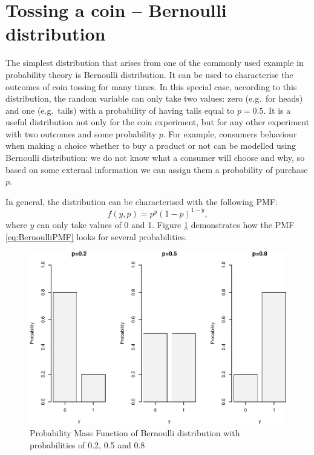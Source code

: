 \documentclass[
]{book}
\theoremstyle{definition}
\theoremstyle{definition}
\theoremstyle{definition}
\theoremstyle{definition}
\theoremstyle{remark}
\begin{document}
\hypertarget{distributionBernoulli}{%
\section{Tossing a coin -- Bernoulli distribution}\label{distributionBernoulli}}

The simplest distribution that arises from one of the commonly used example in probability theory is Bernoulli distribution. It can be used to characterise the outcomes of coin tossing for many times. In this special case, according to this distribution, the random variable can only take two values: zero (e.g.~for heads) and one (e.g.~tails) with a probability of having tails equal to \(p=0.5\). It is a useful distribution not only for the coin experiment, but for any other experiment with two outcomes and some probability \(p\). For example, consumers behaviour when making a choice whether to buy a product or not can be modelled using Bernoulli distribution: we do not know what a consumer will choose and why, so based on some external information we can assign them a probability of purchase \(p\).

In general, the distribution can be characterised with the following PMF:
\begin{equation}
    f(y, p) = p^y (1-p)^{1-y},
    \label{eq:BernoulliPMF}
\end{equation}
where \(y\) can only take values of 0 and 1. Figure \ref{fig:bernoulliPMF} demonstrates how the PMF \eqref{eq:BernoulliPMF} looks for several probabilities.

\begin{figure}
\centering
\includegraphics{Svetunkov---Statistics-for-Business-Analytics_files/figure-latex/bernoulliPMF-1.pdf}
\caption{\label{fig:bernoulliPMF}Probability Mass Function of Bernoulli distribution with probabilities of 0.2, 0.5 and 0.8}
\end{figure}
\end{document}
